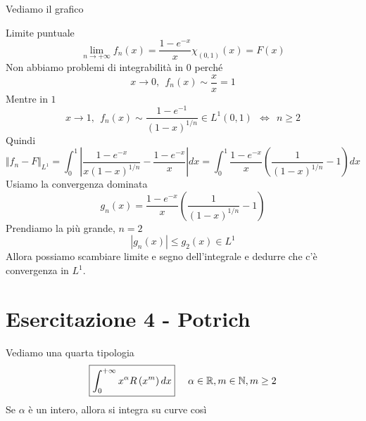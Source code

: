 Vediamo il grafico


Limite puntuale
\begin{equation*}
\lim\limits _{n\rightarrow + \infty } f_{n}(x) = \frac{1 - e^{ - x}}{x} \chi _{(0,1)} (x) = F(x)
\end{equation*}
Non abbiamo problemi di integrabilità in $0$ perché
\begin{equation*}
x\rightarrow 0,\ \ f_{n}(x) \sim \frac{x}{x} = 1
\end{equation*}
Mentre in $1$
\begin{equation*}
x\rightarrow 1,\ \ f_{n}(x) \sim \frac{1 - e^{ - 1}}{(1 - x)^{1/n}} \in L^{1}(0,1) \ \ \iff \ \ n\geq 2
\end{equation*}
Quindi
\begin{equation*}
\Vert f_{n} - F\Vert _{L^{1}} = \int ^{1}_{0}\left| \frac{1 - e^{ - x}}{x(1 - x)^{1/n}} - \frac{1 - e^{ - x}}{x}\right| dx = \int ^{1}_{0}\frac{1 - e^{ - x}}{x}\left(\frac{1}{(1 - x)^{1/n}} - 1\right) dx
\end{equation*}
Usiamo la convergenza dominata
\begin{equation*}
g_{n}(x) = \frac{1 - e^{ - x}}{x}\left(\frac{1}{(1 - x)^{1/n}} - 1\right)
\end{equation*}
Prendiamo la più grande, $n = 2$
\begin{equation*}
| g_{n}(x)| \leq g_{2}(x) \in L^{1}
\end{equation*}
Allora possiamo scambiare limite e segno dell'integrale e dedurre che c'è convergenza in $L^{1}$.
\chapter{Esercitazione 4 - Potrich}
\ParteEsercizi
\Esercizio{}

Vediamo una quarta tipologia
\begin{equation*}
\boxed{\int ^{ + \infty }_{0} x^{\alpha } R\left(x^{m}\right) dx} \ \ \ \ \alpha \in \mathbb{R}  ,m\in \mathbb{N}  ,m\geq 2
\end{equation*}
Se $\alpha $ è un intero, allora si integra su curve così


